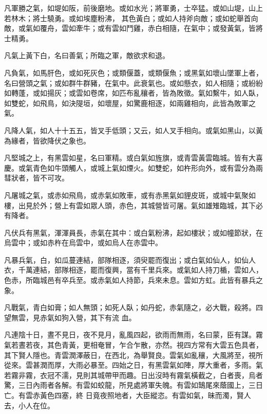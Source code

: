 \begin{pinyinscope}
 凡軍勝之氣，如堤如阪，前後磨地。或如水光；將軍勇，士卒猛。或如山堤，山上若林木；將士驍勇。或如埃塵粉沸，
 其色黃白；或如人持斧向敵；或如蛇舉首向敵，或氣如覆舟，雲如牽牛；或有雲如鬥雞，赤白相隨，在氣中；或發黃氣，皆將士精勇。



 凡氣上黃下白，名曰善氣；所臨之軍，敵欲求和退。



 凡負氣，如馬肝色，或如死灰色；或類偃蓋，或類偃魚；或黑氣如壞山墜軍上者，名曰營頭之氣；或如群牛群豬，在氣中。此衰氣也。或如懸衣，如人相隨；或紛紛如轉蓬，或如揚灰；或雲如卷席，如匹布亂穰者，皆為敗徵。氣如繫牛，如人臥，如雙蛇，如飛鳥，如決隄垣，如壞屋，如驚鹿相逐，如兩雞相向，此皆為敗軍之氣。



 凡降人氣，如人十十五五，皆叉手低頭；又云，如人叉手相向。或氣如黑山，以黃為緣者，皆欲降伏之象也。



 凡堅城之上，有黑雲如星，名曰軍精。或白氣如旌旗，或青雲黃雲臨城。皆有大喜慶。或氣青色如牛頭觸人，或城上氣如煙火。如雙蛇，如杵形向外，或有雲分為兩彗狀者，皆不可攻。



 凡屠城之氣，或赤如飛鳥，或赤氣如敗車，或有赤黑氣如貍皮斑，或城中氣聚如樓，出見於外；營上有雲如眾人頭，赤色，其城營皆可屠。氣如雄雉臨城，其下必有降者。



 凡伏兵有黑氣，渾渾員長，赤氣在其中：或白氣粉沸，起如樓狀；或如幢節狀，在烏雲中；或如赤杵在烏雲中，或如烏人在赤雲中。



 凡暴兵氣，白，如瓜蔓連結，部隊相逐，須臾罷而復出；或白氣如仙人，如仙人衣，千萬連結，部隊相逐，罷而復興，當有千里兵來。或氣如人持刀楯，雲如人，色赤，所臨城邑有卒兵至。或赤氣如人持節，兵來未息。雲如方虹。此皆有暴兵之象。



 凡戰氣，青白如膏；如人無頭；如死人臥；如丹蛇，赤氣隨之，必大戰，殺將。四望無雲，見赤氣如狗入營，其下有流
 血。



 凡連陰十日，晝不見日，夜不見月，亂風四起，欲雨而無雨，名曰蒙，臣有謀。霧氣若晝若夜，其色青黃，更相奄冒，乍合乍散，亦然。視四方常有大雲五色具者，其下賢人隱也。青雲潤澤蔽日，在西北，為舉賢良。雲氣如亂穰，大風將至，視所從來。雲甚潤而厚，大雨必暴至。四始之日，有黑雲氣如陣，厚大重者，多雨。氣若霧非霧，衣冠不濡，見則其城帶甲而趣。日出沒時有霧氣橫截之，白者喪，烏者驚，三日內雨者各解。有雲如蛟龍，所見處將軍失魄。有雲如鵠尾來蔭國上，三日亡。有雲赤黃色四塞，終
 日竟夜照地者，大臣縱恣。有雲如氣，昧而濁，賢人去，小人在位。




\end{pinyinscope}
